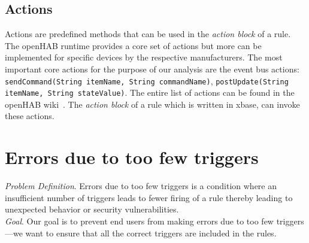 \documentclass{sig-alternate-05-2015}
\begin{document}
\subsection{Actions}
\label{subsec:actions}
Actions are predefined methods that can be used in the \textit{action block} of a rule. The openHAB runtime provides a core set of actions but more can be implemented for specific devices by the respective manufacturers. The most important core actions for the purpose of our analysis are the event bus actions: \texttt{sendCommand(String itemName, String commandName)}, \texttt{postUpdate(String itemName, String stateValue)}. The entire list of actions can be found in the openHAB wiki~\cite{openhabwiki}. The \textit{action block} of a rule which is written in xbase, can invoke these actions. 

\section{Errors due to too few triggers}
\label{sec:theory}
\emph{Problem Definition}. Errors due to too few triggers is a condition where an insufficient number of triggers leads to fewer firing of a rule thereby leading to unexpected behavior or security vulnerabilities. \\

\emph{Goal}. Our goal is to prevent end users from making errors due to too few triggers---we want to ensure that all the correct triggers are included in the rules. \\
\end{document}
